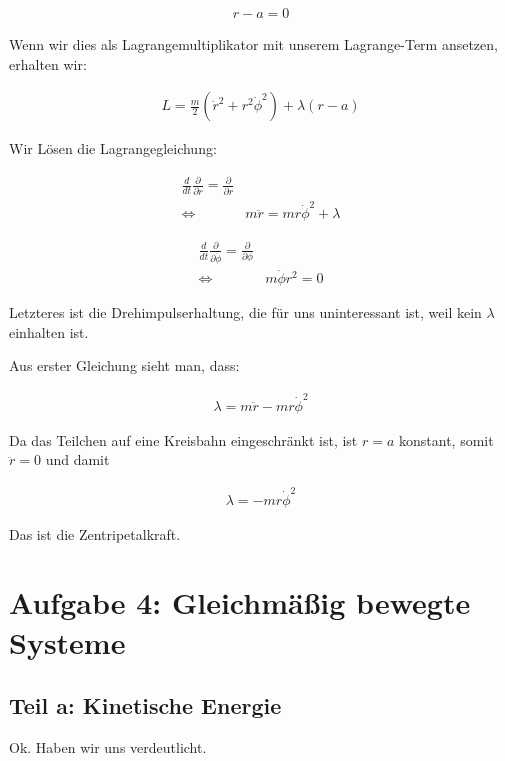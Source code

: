 \documentclass[a4paper,german,12pt,smallheadings]{scrartcl}
\begin{document}
\begin{align*}
  r - a = 0
\end{align*}

Wenn wir dies als Lagrangemultiplikator mit unserem Lagrange-Term ansetzen, erhalten wir:

\begin{align*}
  L = \frac{m}{2} (\dot{r}^2 + r^2\dot{\phi}^2)  + \lambda(r-a)
\end{align*}

Wir Lösen die Lagrangegleichung:

\begin{align*}
  \frac{d}{dt} \frac{\partial}{\partial \dot{r}} = \frac{\partial}{\partial r} \\
  \Leftrightarrow\quad& m\ddot{r} = mr\dot{\phi}^2 + \lambda
\end{align*}

\begin{align*}
  \frac{d}{dt} \frac{\partial}{\partial \dot{\phi}} = \frac{\partial}{\partial \phi} \\
  \Leftrightarrow\quad& m\ddot{\phi}r^2 = 0
\end{align*}

Letzteres ist die Drehimpulserhaltung, die für uns uninteressant ist, weil kein
$\lambda$ einhalten ist.

Aus erster Gleichung sieht man, dass:

\begin{align*}
  \lambda = m\ddot{r} - mr\dot{\phi}^2
\end{align*}

Da das Teilchen auf eine Kreisbahn eingeschränkt ist, ist $r=a$ konstant, somit $\ddot{r} = 0$ und damit

\begin{align*}
  \lambda = -mr\dot{\phi}^2
\end{align*}

Das ist die Zentripetalkraft.

\section{Aufgabe 4: Gleichmäßig bewegte Systeme}
\subsection*{Teil a: Kinetische Energie}

Ok. Haben wir uns verdeutlicht.
\end{document}
